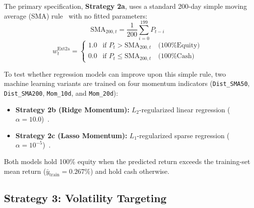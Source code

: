 \documentclass[11pt, a4paper]{article}
\begin{document}
The primary specification, \textbf{Strategy 2a}, uses a standard 200-day simple moving average (SMA) rule~\cite{faber2007} with no fitted parameters:
\begin{equation}
\text{SMA}_{200,t} = \frac{1}{200}\sum_{i=0}^{199} P_{t-i}
\end{equation}
\begin{equation}
w_t^{\text{Ext2a}} = \begin{cases} 1.0 & \text{if } P_t > \text{SMA}_{200,t} \quad \text{(100\% Equity)} \\ 0.0 & \text{if } P_t \le \text{SMA}_{200,t} \quad \text{(100\% Cash)} \end{cases}
\end{equation}

To test whether regression models can improve upon this simple rule, two machine learning variants are trained on four momentum indicators (\texttt{Dist\_SMA50}, \texttt{Dist\_SMA200}, \texttt{Mom\_10d}, and \texttt{Mom\_20d}):
\begin{itemize}
    \item \textbf{Strategy 2b (Ridge Momentum):} $L_2$-regularized linear regression ($\alpha = 10.0$)~\cite{hoerl1970}.
    \item \textbf{Strategy 2c (Lasso Momentum):} $L_1$-regularized sparse regression ($\alpha = 10^{-5}$)~\cite{tibshirani1996, chinco2019}.
\end{itemize}
Both models hold 100\% equity when the predicted return exceeds the training-set mean return ($\bar{y}_{\text{train}} = 0.267\%$) and hold cash otherwise.

\subsection{Strategy 3: Volatility Targeting}
\label{sec:s3}
\end{document}
